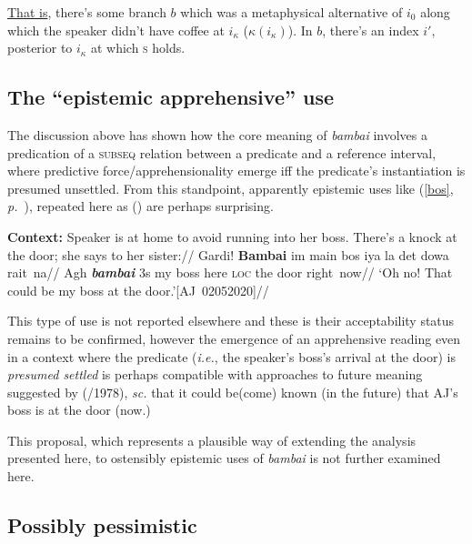 \ul{That is}, there's some branch $ b $ which was a metaphysical alternative of $ i_0 $ along which the speaker didn't have coffee at $ i_\kappa $ ($ \kappa(i_\kappa) $). In $ b $, there's an index $ i' $, posterior to $ i_\kappa $ at which \textsc{s} holds.
\xe

\subsection{The ``epistemic apprehensive'' use}

The discussion above has shown how the core meaning of \textit{bambai} involves a predication of a \textsc{subseq} relation between a predicate and a reference interval, where predictive force/apprehensionality emerge iff the predicate's instantiation is presumed unsettled. From this standpoint, apparently epistemic uses like (\ref{bos}, \textit{p.~\pageref{bos}}), repeated here as () are perhaps surprising.


\ex{}\begingl\glpreamble\textup{\textbf{Context:} Speaker is at home to avoid running into her boss. There's a knock at the door; she says to her sister:}//
\gla Gardi! \textbf{Bambai} im main bos iya la det dowa rait~na//
\glb Agh \textit{\textbf{bambai}} 3s my boss here \textsc{loc} the door right~now//
\glft`Oh no! That could be my boss at the door.'\hfill[AJ~02052020]//\endgl
\xe

This type of use is not reported elsewhere and these is their acceptability status remains to be confirmed, however the emergence of an apprehensive reading even in a context where the predicate (\textit{i.e.}, the speaker's boss's arrival at the door) is \textit{presumed settled} is perhaps compatible with approaches to future meaning suggested by \citeauthor{Bennett} (\citeyear[100]{Bennett}/1978), \textit{sc.} that it could be(come) known (in the future) that AJ's boss is at the door (now.)

This proposal, which represents a plausible way of extending the analysis presented here, to ostensibly epistemic uses of \textit{bambai} is not further examined here.



\subsection{Possibly pessimistic}

